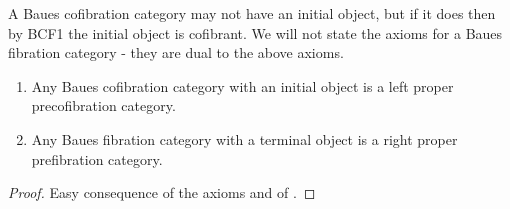 A Baues cofibration category may not have  an initial object, but if it does then by BCF1 the initial object is cofibrant. We will not state the axioms for a Baues fibration category - they are dual to the above axioms.

\begin{prop}
\label{prop:relcatcofcatbaues}
\mbox{}
\begin{enumerate}
\item
Any Baues cofibration category with an initial object is a left proper precofibration category.
\item
Any Baues fibration category with a terminal object is a right proper prefibration category.
\end{enumerate}
\end{prop}

\begin{proof}
Easy consequence of the axioms and of .
\end{proof}


